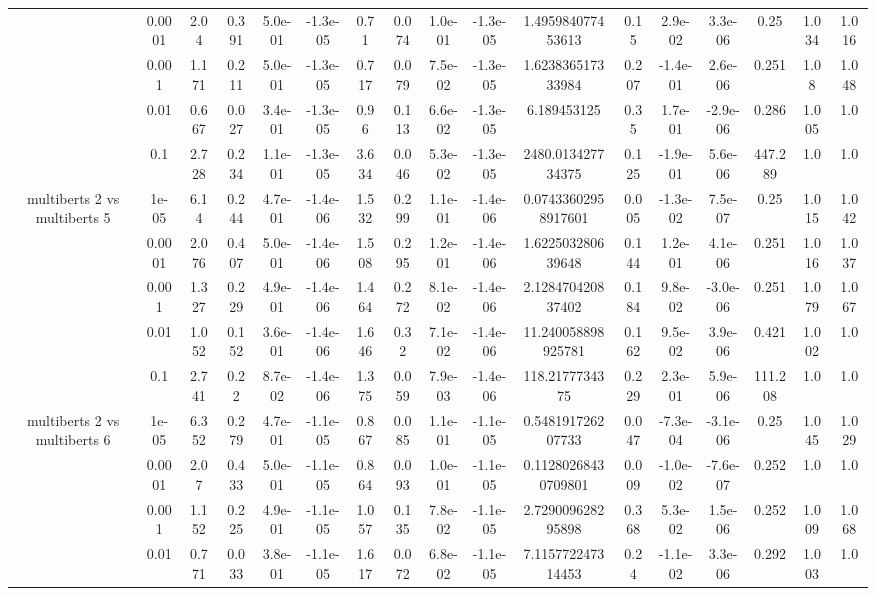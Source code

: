 \begin{tabular}{|c|c|c|c|c|c|c|c|c|c|c|c|c|c|c|c|c|}
 & 0.0001 & 2.04 & 0.391 & 5.0e-01 & -1.3e-05 & 0.71 & 0.074 & 1.0e-01 & -1.3e-05 & 1.495984077453613 & 0.15 & 2.9e-02 & 3.3e-06 & 0.25 & 1.034 & 1.016 \\
 & 0.001 & 1.171 & 0.211 & 5.0e-01 & -1.3e-05 & 0.717 & 0.079 & 7.5e-02 & -1.3e-05 & 1.623836517333984 & 0.207 & -1.4e-01 & 2.6e-06 & 0.251 & 1.08 & 1.048 \\
 & 0.01 & 0.667 & 0.027 & 3.4e-01 & -1.3e-05 & 0.96 & 0.113 & 6.6e-02 & -1.3e-05 & 6.189453125 & 0.35 & 1.7e-01 & -2.9e-06 & 0.286 & 1.005 & 1.0 \\
 & 0.1 & 2.728 & 0.234 & 1.1e-01 & -1.3e-05 & 3.634 & 0.046 & 5.3e-02 & -1.3e-05 & 2480.013427734375 & 0.125 & -1.9e-01 & 5.6e-06 & 447.289 & 1.0 & 1.0 \\
\hline
\multirow{5}{*}{multiberts 2 vs multiberts 5} & 1e-05 & 6.14 & 0.244 & 4.7e-01 & -1.4e-06 & 1.532 & 0.299 & 1.1e-01 & -1.4e-06 & 0.07433602958917601 & 0.005 & -1.3e-02 & 7.5e-07 & 0.25 & 1.015 & 1.042 \\
 & 0.0001 & 2.076 & 0.407 & 5.0e-01 & -1.4e-06 & 1.508 & 0.295 & 1.2e-01 & -1.4e-06 & 1.622503280639648 & 0.144 & 1.2e-01 & 4.1e-06 & 0.251 & 1.016 & 1.037 \\
 & 0.001 & 1.327 & 0.229 & 4.9e-01 & -1.4e-06 & 1.464 & 0.272 & 8.1e-02 & -1.4e-06 & 2.128470420837402 & 0.184 & 9.8e-02 & -3.0e-06 & 0.251 & 1.079 & 1.067 \\
 & 0.01 & 1.052 & 0.152 & 3.6e-01 & -1.4e-06 & 1.646 & 0.32 & 7.1e-02 & -1.4e-06 & 11.240058898925781 & 0.162 & 9.5e-02 & 3.9e-06 & 0.421 & 1.002 & 1.0 \\
 & 0.1 & 2.741 & 0.22 & 8.7e-02 & -1.4e-06 & 1.375 & 0.059 & 7.9e-03 & -1.4e-06 & 118.2177734375 & 0.229 & 2.3e-01 & 5.9e-06 & 111.208 & 1.0 & 1.0 \\
\hline
\multirow{5}{*}{multiberts 2 vs multiberts 6} & 1e-05 & 6.352 & 0.279 & 4.7e-01 & -1.1e-05 & 0.867 & 0.085 & 1.1e-01 & -1.1e-05 & 0.548191726207733 & 0.047 & -7.3e-04 & -3.1e-06 & 0.25 & 1.045 & 1.029 \\
 & 0.0001 & 2.07 & 0.433 & 5.0e-01 & -1.1e-05 & 0.864 & 0.093 & 1.0e-01 & -1.1e-05 & 0.11280268430709801 & 0.009 & -1.0e-02 & -7.6e-07 & 0.252 & 1.0 & 1.0 \\
 & 0.001 & 1.152 & 0.225 & 4.9e-01 & -1.1e-05 & 1.057 & 0.135 & 7.8e-02 & -1.1e-05 & 2.729009628295898 & 0.368 & 5.3e-02 & 1.5e-06 & 0.252 & 1.009 & 1.068 \\
 & 0.01 & 0.771 & 0.033 & 3.8e-01 & -1.1e-05 & 1.617 & 0.072 & 6.8e-02 & -1.1e-05 & 7.115772247314453 & 0.24 & -1.1e-02 & 3.3e-06 & 0.292 & 1.003 & 1.0 \\

\end{tabular}
